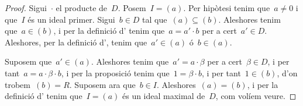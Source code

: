 \documentclass[../estructures-algebraiques.tex]{subfiles}
\begin{document}
    \begin{proof}
        Sigui~\(\cdot\) el producte de~\(D\).
        Posem~\(I=(a)\).
        Per hipòtesi tenim que~\(a\neq0\) i que~\(I\) és un ideal primer.
        Sigui~\(b\in D\) tal que~\((a)\subseteq(b)\).
        Aleshores tenim que~\(a\in(b)\), i per la definició d' tenim que~\(a=a'\cdot b\) per a cert~\(a'\in D\).
        Aleshores, per la definició d', tenim que~\(a'\in(a)\) ó~\(b\in(a)\).

        Suposem que~\(a'\in(a)\).
        Aleshores tenim que~\(a'=a\cdot\beta\) per a cert~\(\beta\in D\), i per tant~\(a=a\cdot\beta\cdot b\), i per la proposició  tenim que~\(1=\beta\cdot b\), i per tant~\(1\in(b)\), d'on trobem~\((b)=R\).
        Suposem ara que~\(b\in I\).
        Aleshores~\((a)=(b)\), i per la definició d' tenim que~\(I=(a)\) és un ideal maximal de~\(D\), com volíem veure.
    \end{proof}
\end{document}
